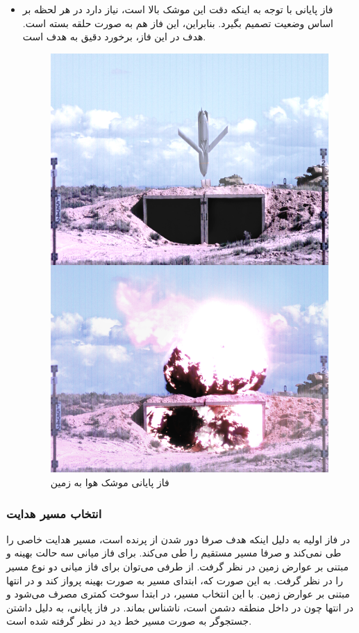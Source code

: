 \begin{itemize}
	\item فاز پایانی
	با توجه به اینکه دقت این موشک بالا است، نیاز دارد در هر لحظه بر اساس وضعیت تصمیم بگیرد. بنابراین، این فاز هم به صورت حلقه بسته است. هدف در این فاز، برخورد دقیق به هدف است.
			 \begin{figure}[H]
		\centering
		\includegraphics[width=0.75\linewidth]{../Figure/Q1/end.jpg}
		\caption{فاز پایانی موشک هوا به زمین
		}
	\end{figure}
\end{itemize}

\subsubsection{انتخاب مسیر هدایت}

در فاز اولیه به دلیل اینکه هدف صرفا دور شدن از پرنده است، مسیر هدایت خاصی را طی نمی‌کند و صرفا مسیر مستقیم را طی می‌کند. برای فاز میانی سه حالت بهینه و مبتنی بر عوارض زمین در نظر گرفت. از طرفی می‌توان برای فاز میانی دو نوع مسیر را در نظر گرفت. به این صورت که، ابتدای مسیر به صورت بهینه پرواز کند و در انتها مبتنی بر عوارض زمین. با این انتخاب مسیر، در ابتدا سوخت کمتری مصرف می‌شود و در انتها چون در داخل منطقه دشمن است، ناشناس بماند. در فاز پایانی، به دلیل داشتن جستجوگر به صورت مسیر خط دید در نظر گرفته شده است.
